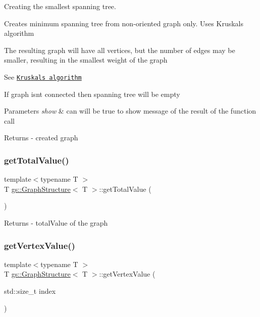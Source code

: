 Creating the smallest spanning tree. 

Creates minimum spanning tree from non-\/oriented graph only. Uses Kruskal\textquotesingle{}s algorithm

The resulting graph will have all vertices, but the number of edges may be smaller, resulting in the smallest weight of the graph

See \href{https://en.wikipedia.org/wiki/Kruskal%27s_algorithm}{\tt Kruskal\textquotesingle{}s algorithm}

If graph isn\textquotesingle{}t connected then spanning tree will be empty 
\begin{DoxyParams}{Parameters}
{\em show} & can will be true to show message of the result of the function call \\
\hline
\end{DoxyParams}
\begin{DoxyReturn}{Returns}
-\/ created graph 
\end{DoxyReturn}
\mbox{\label{classgs_1_1_graph_structure_a430f8d15cb01da7f7c7054b7a9e831ee}} 
\subsubsection{\texorpdfstring{get\+Total\+Value()}{getTotalValue()}}
{\footnotesize\ttfamily template$<$typename T $>$ \\
T \mbox{\hyperlink{classgs_1_1_graph_structure}{gs\+::\+Graph\+Structure}}$<$ T $>$\+::get\+Total\+Value (\begin{DoxyParamCaption}{ }\end{DoxyParamCaption})}

\begin{DoxyReturn}{Returns}
-\/ total\+Value of the graph 
\end{DoxyReturn}
\mbox{\label{classgs_1_1_graph_structure_a0adafe2cbe3eb635da12957b9b0ad803}} 
\subsubsection{\texorpdfstring{get\+Vertex\+Value()}{getVertexValue()}}
{\footnotesize\ttfamily template$<$typename T $>$ \\
T \mbox{\hyperlink{classgs_1_1_graph_structure}{gs\+::\+Graph\+Structure}}$<$ T $>$\+::get\+Vertex\+Value (\begin{DoxyParamCaption}\item[{std\+::size\+\_\+t}]{index }\end{DoxyParamCaption})}


